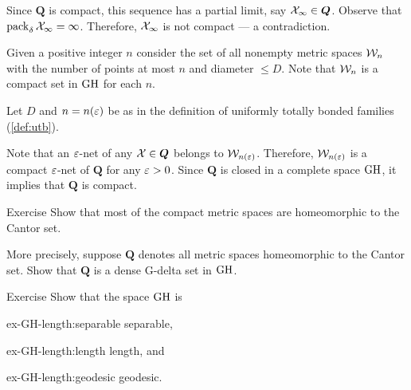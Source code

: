 Since $\bm{Q}$ is compact, 
this sequence has a partial limit, say $\mathcal{X}_\infty\in\bm{Q}$.
Observe that $\operatorname{\rm pack}\nolimits_{\delta} \mathcal{X}_\infty=\infty$.
Therefore, $\mathcal{X}_\infty$ is not compact --- a contradiction.

Given a positive integer $n$ consider the set of all nonempty metric spaces $\mathcal{W}_n$
with the number of points at most $n$ and diameter $\le D$.
Note that $\mathcal{W}_n$ is a compact set in $\operatorname{\rm GH}\nolimits$ for each $n$.

Let $D$ and $n=n(\varepsilon)$ be as in the definition of uniformly totally bonded families (\ref{def:utb}).

Note that an $\varepsilon$-net of any $\mathcal{X}\in\bm{Q}$ belongs to $\mathcal{W}_{n(\varepsilon)}$.
Therefore, $\mathcal{W}_{n(\varepsilon)}$ is a compact $\varepsilon$-net of $\bm{Q}$ for any $\varepsilon>0$.
Since $\bm{Q}$ is closed in a complete space $\operatorname{\rm GH}\nolimits$, it implies that $\bm{Q}$ is compact.
\qeds

\begin{thm}{Exercise}\label{ex:GH-G-delta}
Show that most of the compact metric spaces are homeomorphic to the Cantor set.

More precisely, suppose $\bm{Q}$ denotes all metric spaces homeomorphic to the Cantor set.
Show that $\bm{Q}$ is a dense G-delta set in $\operatorname{\rm GH}\nolimits$.
\end{thm}


\begin{thm}{Exercise}\label{ex-GH-length}
Show that the space $\operatorname{\rm GH}\nolimits$ is 
\begin{multicols}{3}

\begin{subthm}{ex-GH-length:separable}
separable,
\end{subthm}

\begin{subthm}{ex-GH-length:length}
length, and
\end{subthm}

\begin{subthm}{ex-GH-length:geodesic}
geodesic.
\end{subthm}

\end{multicols}


\end{thm}

